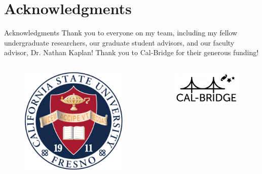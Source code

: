 \documentclass{beamer}
\begin{document}
\section{Acknowledgments}
\begin{frame}{Acknowledgments}
Thank you to everyone on my team, including my fellow undergraduate researchers, our graduate student advisors, and our faculty advisor, Dr. Nathan Kaplan! Thank you to Cal-Bridge for their generous funding!
\begin{columns}[c]
            \begin{column}{.25\textwidth}
            \begin{figure}
                \centering
                \includegraphics[width=1\textwidth]{Victoria/Logos/CSU,Fresno.png}
            \end{figure}      
            \end{column}
            \begin{column}{.25\textwidth}
            \begin{figure}
                \centering
                \includegraphics[width=1.2\textwidth]{Victoria/Logos/Cal-Bridge.jpg}

\end{figure}
\end{column}
\end{columns}
\end{frame}
\end{document}
